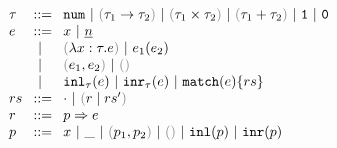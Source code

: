 \begin{figure}[h]
$\arraycolsep=4pt\begin{array}{lll}
\tau & ::= &
  \tnum ~\vert~
  \tarr{\tau_1}{\tau_2} ~\vert~
  \tprod{\tau_1}{\tau_2} ~\vert~
  \tsum{\tau_1}{\tau_2} ~\vert~
  \tunit ~\vert~
  \tvoid \\
e & ::= &
  x ~\vert~
  \hnum{n} \\
  & ~\vert~ &
  \hlam{x}{\tau}{e} ~\vert~
  \hap{e_1}{e_2} \\
  & ~\vert~ &
  \hpair{e_1}{e_2} ~\vert~
  \htriv \\
  & ~\vert~ &
  \hinl{\tau}{e} ~\vert~
  \hinr{\tau}{e} ~\vert~
  \hmatch{e}{rs} \\
rs & ::= &
  \cdot ~\vert~ \hrules{r}{rs'} \\
r & ::= &
  \hrul{p}{e} \\
p & ::= &
  x ~\vert~
  \_ ~\vert~
  \hpair{p_1}{p_2} ~\vert~
  \htriv ~\vert~
  \hinlp{p} ~\vert~
  \hinrp{p}
\end{array}$
\end{figure}

